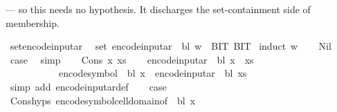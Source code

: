 \begin{isabellebody}
\begin{isamarkuptext}
   — so this needs no
   hypothesis.  It discharges the
  set-containment side of 
  membership.%
\end{isamarkuptext}\isamarkuptrue%
\isamarkupfalse%
\ set{\isacharunderscore}{\kern0pt}encode{\isacharunderscore}{\kern0pt}input{\isacharunderscore}{\kern0pt}ar{\isacharcolon}{\kern0pt}\isanewline
\ \ {\isachardoublequoteopen}set\ {\isacharparenleft}{\kern0pt}encode{\isacharunderscore}{\kern0pt}input{\isacharunderscore}{\kern0pt}ar\ {\isasymGamma}\ bl\ w{\isacharparenright}{\kern0pt}\ {\isasymsubseteq}\ {\isacharbraceleft}{\kern0pt}BIT{}{\isacharcomma}{\kern0pt}\ BIT{}{\isacharbraceright}{\kern0pt}{\isachardoublequoteclose}\isanewline
%
\isadelimproof
%
\endisadelimproof
%
\isatagproof
{}\isamarkupfalse%
\ {\isacharparenleft}{\kern0pt}induct\ w{\isacharparenright}{\kern0pt}\isanewline
\ \ \isamarkupfalse%
\ Nil\ \isamarkupfalse%
\ {\isacharquery}{\kern0pt}case\ \isamarkupfalse%
\ simp\isanewline
{}\isamarkupfalse%
\isanewline
\ \ \isamarkupfalse%
\ {\isacharparenleft}{\kern0pt}Cons\ x\ xs{\isacharparenright}{\kern0pt}\isanewline
\ \ \isamarkupfalse%
\ {\isachardoublequoteopen}encode{\isacharunderscore}{\kern0pt}input{\isacharunderscore}{\kern0pt}ar\ {\isasymGamma}\ bl\ {\isacharparenleft}{\kern0pt}x\ {\isacharhash}{\kern0pt}\ xs{\isacharparenright}{\kern0pt}\isanewline
\ \ \ \ \ \ \ \ \ \ {\isacharequal}{\kern0pt}\ encode{\isacharunderscore}{\kern0pt}symbol\ {\isasymGamma}\ bl\ x\ {\isacharat}{\kern0pt}\ encode{\isacharunderscore}{\kern0pt}input{\isacharunderscore}{\kern0pt}ar\ {\isasymGamma}\ bl\ xs{\isachardoublequoteclose}\isanewline
\ \ \ \ \isamarkupfalse%
\ {\isacharparenleft}{\kern0pt}simp\ add{\isacharcolon}{\kern0pt}\ encode{\isacharunderscore}{\kern0pt}input{\isacharunderscore}{\kern0pt}ar{\isacharunderscore}{\kern0pt}def{\isacharparenright}{\kern0pt}\isanewline
\ \ \isamarkupfalse%
\ {\isacharquery}{\kern0pt}case\ \isamarkupfalse%
\ Cons{\isachardot}{\kern0pt}hyps\ encode{\isacharunderscore}{\kern0pt}symbol{\isacharunderscore}{\kern0pt}cell{\isacharunderscore}{\kern0pt}domain{\isacharbrackleft}{\kern0pt}of\ {\isasymGamma}\ bl\ x{\isacharbrackright}{\kern0pt}\ \isamarkupfalse%

\end{isabellebody}
